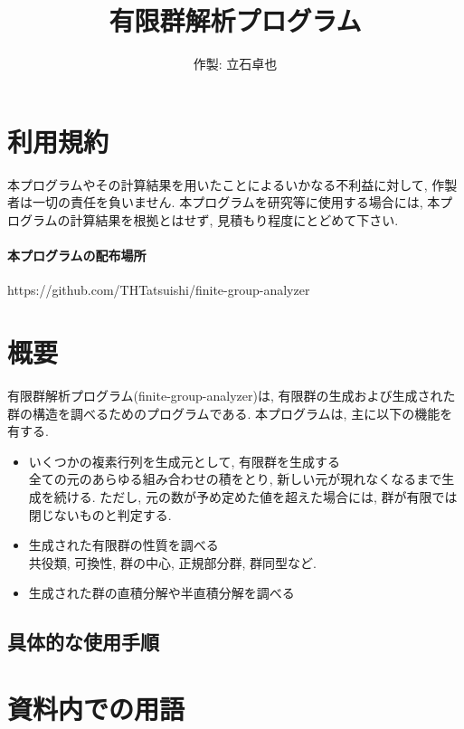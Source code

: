 \documentclass[11pt, a4paper]{jsarticle}
\title{
有限群解析プログラム
}
\author{
作製: 立石卓也
}
\begin{document}
\newcommand{\Slash}[1]{{\ooalign{\hfil/\hfil\crcr$#1$}}}		%
\maketitle
\section{利用規約}
本プログラムやその計算結果を用いたことによるいかなる不利益に対して, 作製者は一切の責任を負いません.
本プログラムを研究等に使用する場合には, 本プログラムの計算結果を根拠とはせず, 見積もり程度にとどめて下さい.

\paragraph{本プログラムの配布場所}
https://github.com/THTatsuishi/finite-group-analyzer

\section{概要}
有限群解析プログラム(finite-group-analyzer)は, 有限群の生成および生成された群の構造を調べるためのプログラムである.
本プログラムは, 主に以下の機能を有する.
\begin{itemize}
\item いくつかの複素行列を生成元として, 有限群を生成する\\
全ての元のあらゆる組み合わせの積をとり, 新しい元が現れなくなるまで生成を続ける.
ただし, 元の数が予め定めた値を超えた場合には, 群が有限では閉じないものと判定する.
\item 生成された有限群の性質を調べる\\
共役類, 可換性, 群の中心, 正規部分群, 群同型など.
\item 生成された群の直積分解や半直積分解を調べる
\end{itemize}

\subsection{具体的な使用手順}




\section{資料内での用語}
\end{document}
